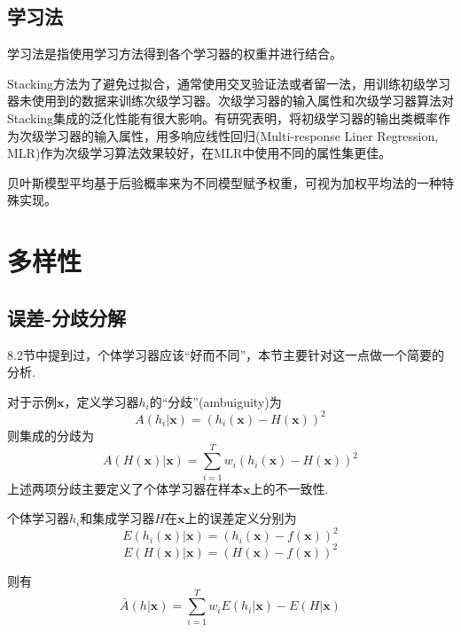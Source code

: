 \subsection{学习法}

学习法是指使用学习方法得到各个学习器的权重并进行结合。

Stacking方法为了避免过拟合，通常使用交叉验证法或者留一法，用训练初级学习器未使用到的数据来训练次级学习器。次级学习器的输入属性和次级学习器算法对Stacking集成的泛化性能有很大影响。有研究表明，将初级学习器的输出类概率作为次级学习器的输入属性，用多响应线性回归(Multi-response Liner Regression, MLR)作为次级学习算法效果较好，在MLR中使用不同的属性集更佳。

贝叶斯模型平均基于后验概率来为不同模型赋予权重，可视为加权平均法的一种特殊实现。

\section{多样性}

\subsection{误差-分歧分解}

8.2节中提到过，个体学习器应该``好而不同''，本节主要针对这一点做一个简要的分析.

对于示例$\mathbf{x}$，定义学习器$h_i$的``分歧''(ambuiguity)为
\begin{equation}
A(h_i|\mathbf{x})=(h_i(\mathbf{x})-H(\mathbf{x}))^2
\end{equation}
则集成的分歧为
\begin{equation}
A(H(\mathbf{x})|\mathbf{x})=\sum_{i=1}^Tw_i(h_i(\mathbf{x})-H(\mathbf{x}))^2
\end{equation}
上述两项分歧主要定义了个体学习器在样本$\mathbf{x}$上的不一致性.

个体学习器$h_i$和集成学习器$H$在$\mathbf{x}$上的误差定义分别为
\begin{equation}
E(h_i(\mathbf{x})|\mathbf{x})=(h_i(\mathbf{x})-f(\mathbf{x}))^2
\end{equation}
\begin{equation}
E(H(\mathbf{x})|\mathbf{x})=(H(\mathbf{x})-f(\mathbf{x}))^2
\end{equation}

则有
\begin{equation}
\bar{A}(h|\mathbf{x})=\sum_{i=1}^Tw_iE(h_i|\mathbf{x})-E(H|\mathbf{x})
\end{equation}

